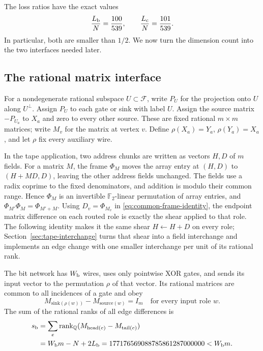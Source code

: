 The loss ratios have the exact values
\[
 \frac{L_{\rm b}}{N}=\frac{100}{539},\qquad
 \frac{L_{\rm c}}{N}=\frac{101}{539}.
\]
In particular, both are smaller than $1/2$.  We now turn the dimension
count into the two interfaces needed later.

\subsection{The rational matrix interface}

For a nondegenerate rational subspace $U\subset\mathcal F$, write
$P_U$ for the projection onto $U$ along $U^\perp$.  Assign $P_U$ to
each gate or sink with label $U$.  Assign the source matrix $-P_{U_a}$
to $X_a$ and zero to every other source.
These are fixed rational $m\times m$ matrices; write $M_v$ for the matrix
at vertex $v$.  Define
$\rho(X_a)=Y_a$, $\rho(Y_a)=X_a$, and let $\rho$ fix every auxiliary
wire.

In the tape application, two address chunks are written as vectors $H,D$
of $m$ fields.  For a matrix $M$, the frame $\Phi_M$ moves the array entry
at $(H,D)$ to $(H+MD,D)$, leaving the other address fields unchanged.
The fields use a radix coprime to the fixed denominators, and addition is
modulo their common range.  Hence $\Phi_M$ is an invertible
$\mathbb F_2$-linear permutation of array entries, and
$\Phi_{M'}\Phi_M=\Phi_{M'+M}$.  Using $D_v=\Phi_{M_v}$
in \eqref{eq:common-frame-identity}, the endpoint matrix difference on each
routed role is exactly the shear applied to that role.  The following identity
makes it the same shear $H\gets H+D$ on every role;
Section~\ref{sec:tape-interchange} turns that shear into a field interchange
and implements an edge change with one smaller interchange per unit of its
rational rank.

\begin{proposition}\label{prop:bit-motif-interface}
The bit network has $W_{\rm b}$ wires, uses only pointwise XOR gates,
and sends its input vector to the permutation $\rho$ of that vector.
Its rational matrices are common to all incidences of a gate and obey
\[
 M_{\mathrm{sink}(\rho(w))}-M_{\mathrm{source}(w)}=I_m
 \quad\text{for every input role }w.
\]
The sum of the rational ranks of all edge differences is
\begin{align}
 s_{\rm b}
 &=\sum_{e}\operatorname{rank}_{\mathbb Q}
      (M_{\mathrm{head}(e)}-M_{\mathrm{tail}(e)})\\
 &=W_{\rm b}m-N+2L_{\rm b}
  =177176569088785861287000000<W_{\rm b}m.
\end{align}
\end{proposition}

